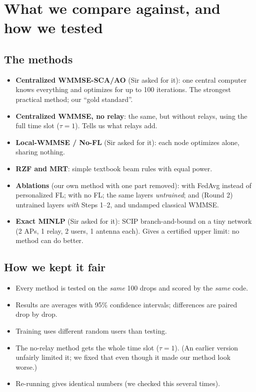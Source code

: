 \documentclass[11pt,a4paper]{article}
\begin{document}
\section{What we compare against, and how we tested}

\subsection*{The methods}
\begin{itemize}
\item \textbf{Centralized WMMSE-SCA/AO} (Sir asked for it): one central computer knows everything and optimizes
  for up to 100 iterations. The strongest practical method; our ``gold standard''.
\item \textbf{Centralized WMMSE, no relay}: the same, but without relays, using the full time slot ($\tau=1$).
  Tells us what relays add.
\item \textbf{Local-WMMSE / No-FL} (Sir asked for it): each node optimizes alone, sharing nothing.
\item \textbf{RZF and MRT}: simple textbook beam rules with equal power.
\item \textbf{Ablations} (our own method with one part removed): with FedAvg instead of personalized FL; with no FL;
  the same layers \emph{untrained}; and (Round 2) untrained layers \emph{with} Steps 1--2, and undamped classical
  WMMSE.
\item \textbf{Exact MINLP} (Sir asked for it): SCIP branch-and-bound on a tiny network (2 APs, 1 relay, 2 users,
  1 antenna each). Gives a certified upper limit: no method can do better.
\end{itemize}

\subsection*{How we kept it fair}
\begin{itemize}
\item Every method is tested on the \emph{same} 100 drops and scored by the \emph{same} code.
\item Results are averages with 95\% confidence intervals; differences are paired drop by drop.
\item Training uses different random users than testing.
\item The no-relay method gets the whole time slot ($\tau = 1$). (An earlier version unfairly limited it; we fixed
  that even though it made our method look worse.)
\item Re-running gives identical numbers (we checked this several times).
\end{itemize}
\end{document}

